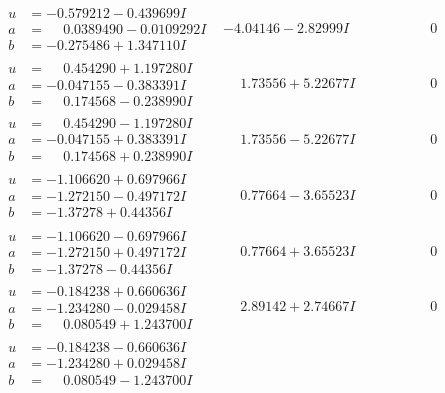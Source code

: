 \documentclass[1p]{elsarticle_modified}
\theoremstyle{definition}
\begin{document}
$$\begin{array}{c|c|c}
\begin{aligned}
u &= -0.579212 - 0.439699 I \\
a &= \phantom{-}0.0389490 - 0.0109292 I \\
b &= -0.275486 + 1.347110 I\end{aligned}
 & -4.04146 - 2.82999 I & \phantom{-0.000000 } 0 \\ \hline\begin{aligned}
u &= \phantom{-}0.454290 + 1.197280 I \\
a &= -0.047155 - 0.383391 I \\
b &= \phantom{-}0.174568 - 0.238990 I\end{aligned}
 & \phantom{-}1.73556 + 5.22677 I & \phantom{-0.000000 } 0 \\ \hline\begin{aligned}
u &= \phantom{-}0.454290 - 1.197280 I \\
a &= -0.047155 + 0.383391 I \\
b &= \phantom{-}0.174568 + 0.238990 I\end{aligned}
 & \phantom{-}1.73556 - 5.22677 I & \phantom{-0.000000 } 0 \\ \hline\begin{aligned}
u &= -1.106620 + 0.697966 I \\
a &= -1.272150 - 0.497172 I \\
b &= -1.37278 + 0.44356 I\end{aligned}
 & \phantom{-}0.77664 - 3.65523 I & \phantom{-0.000000 } 0 \\ \hline\begin{aligned}
u &= -1.106620 - 0.697966 I \\
a &= -1.272150 + 0.497172 I \\
b &= -1.37278 - 0.44356 I\end{aligned}
 & \phantom{-}0.77664 + 3.65523 I & \phantom{-0.000000 } 0 \\ \hline\begin{aligned}
u &= -0.184238 + 0.660636 I \\
a &= -1.234280 - 0.029458 I \\
b &= \phantom{-}0.080549 + 1.243700 I\end{aligned}
 & \phantom{-}2.89142 + 2.74667 I & \phantom{-0.000000 } 0 \\ \hline\begin{aligned}
u &= -0.184238 - 0.660636 I \\
a &= -1.234280 + 0.029458 I \\
b &= \phantom{-}0.080549 - 1.243700 I\end{aligned}

\end{array}$$
\end{document}

